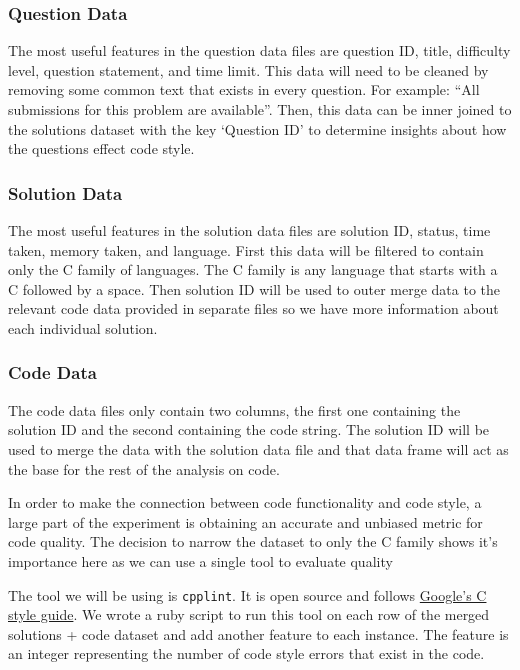 \documentclass{article}
\begin{document}
\subsubsection{Question Data}\label{question-data}

The most useful features in the question data files are question ID,
title, difficulty level, question statement, and time limit. This data
will need to be cleaned by removing some common text that exists in
every question. For example: ``All submissions for this problem are
available''. Then, this data can be inner joined to the solutions
dataset with the key `Question ID' to determine insights about how the
questions effect code style.

\subsubsection{Solution Data}\label{solution-data}

The most useful features in the solution data files are solution ID,
status, time taken, memory taken, and language. First this data will be
filtered to contain only the C family of languages. The C family is any
language that starts with a C followed by a space. Then solution ID will
be used to outer merge data to the relevant code data provided in
separate files so we have more information about each individual
solution.

\subsubsection{Code Data}\label{code-data}

The code data files only contain two columns, the first one containing
the solution ID and the second containing the code string. The solution
ID will be used to merge the data with the solution data file and that
data frame will act as the base for the rest of the analysis on code.

In order to make the connection between code functionality and code
style, a large part of the experiment is obtaining an accurate and
unbiased metric for code quality. The decision to narrow the dataset to
only the C family shows it's importance here as we can use a single tool
to evaluate quality

The tool we will be using is \texttt{cpplint}. It is open source and
follows
\href{https://google.github.io/styleguide/cppguide.html}{Google's C
style guide}. We wrote a ruby script to run this tool on each row of the
merged solutions + code dataset and add another feature to each
instance. The feature is an integer representing the number of code
style errors that exist in the code.
\end{document}
